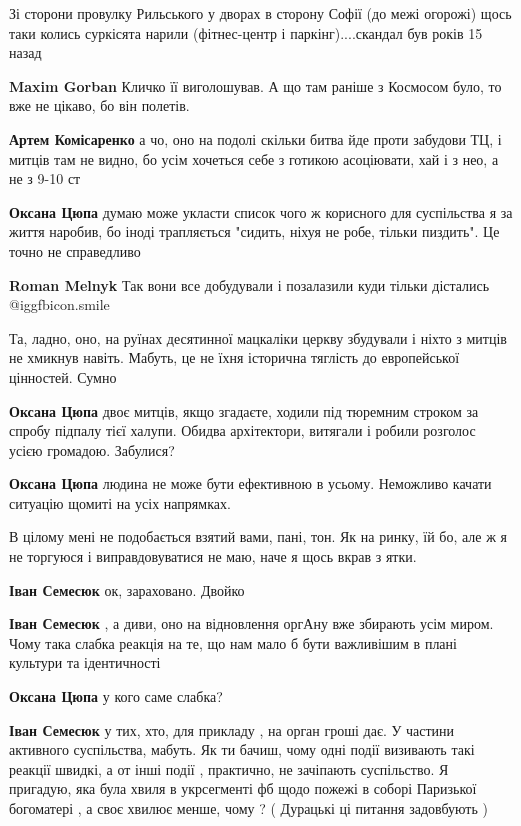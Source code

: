 \begin{itemize}
\begin{itemize}
Зі сторони провулку Рильського у дворах в сторону Софії (до межі огорожі) щось таки колись суркісята нарили (фітнес-центр і паркінг)....скандал був років 15 назад

\textbf{Maxim Gorban} Кличко її виголошував. А що там раніше з Космосом було, то вже не цікаво, бо він полетів.

\textbf{Артем Комісаренко} а чо, оно на подолі скільки битва йде проти забудови ТЦ, і митців там не видно, бо усім хочеться себе з готикою асоціювати, хай і з нео, а не з 9-10 ст


\textbf{Оксана Цюпа} думаю може укласти список чого ж корисного для суспільства я за життя наробив, бо іноді трапляється "сидить, ніхуя не робе, тільки пиздить". Це точно не справедливо

\textbf{Roman Melnyk} Так вони все добудували і позалазили куди тільки дістались  @igg{fbicon.smile} 
\end{itemize} %


Та, ладно, оно, на руїнах десятинної мацкаліки церкву збудували і ніхто з
митців не хмикнув навіть. Мабуть, це не їхня історична тяглість до европейської
цінностей. Сумно

\begin{itemize} %
\textbf{Оксана Цюпа} двоє митців, якщо згадаєте, ходили під тюремним строком за спробу підпалу тієї халупи. Обидва архітектори, витягали і робили розголос усією громадою. Забулися?


\textbf{Оксана Цюпа} людина не може бути ефективною в усьому. Неможливо качати ситуацію щомиті на усіх напрямках.



В цілому мені не подобається взятий вами, пані, тон. Як на ринку, їй бо, але ж я не торгуюся і виправдовуватися не маю, наче я щось вкрав з ятки.

\textbf{Іван Семесюк} ок, зараховано. Двойко

\textbf{Іван Семесюк} , а диви, оно на відновлення оргАну вже збирають усім миром. Чому така слабка реакція на те, що нам мало б бути важливішим в плані культури та ідентичності


\textbf{Оксана Цюпа} у кого саме слабка?

\textbf{Іван Семесюк} у тих, хто, для прикладу , на орган гроші дає. У частини активного суспільства, мабуть. Як ти бачиш, чому одні події визивають такі реакції швидкі, а от інші події , практично, не зачіпають суспільство. Я пригадую, яка була хвиля в укрсегменті фб щодо пожежі в соборі Паризької богоматері , а своє хвилює менше, чому ? ( Дурацькі ці питання задовбують )


\end{itemize}
\end{itemize}
